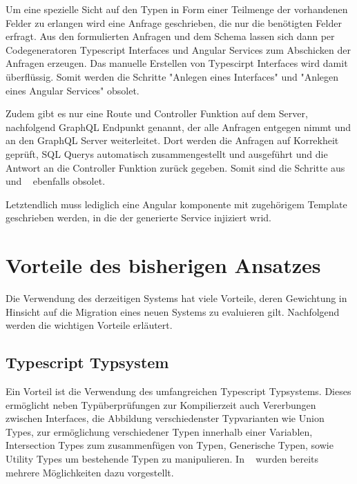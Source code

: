 Um eine spezielle Sicht auf den Typen in Form einer Teilmenge der vorhandenen Felder zu erlangen wird eine Anfrage geschrieben, die
nur die benötigten Felder erfragt. Aus den formulierten Anfragen und dem Schema lassen sich dann per Codegeneratoren Typescript Interfaces und
Angular Services zum Abschicken der Anfragen erzeugen. Das manuelle Erstellen von Typescirpt Interfaces wird damit überflüssig.
Somit werden die Schritte "Anlegen eines Interfaces" und "Anlegen eines Angular Services" obsolet.

Zudem gibt es nur eine Route und Controller Funktion auf dem Server, nachfolgend GraphQL Endpunkt genannt, der alle Anfragen entgegen nimmt
und an den GraphQL Server weiterleitet. Dort werden die Anfragen auf Korrekheit geprüft,
SQL Querys automatisch zusammengestellt und ausgeführt und die Antwort an die Controller Funktion zurück gegeben.
Somit sind die Schritte aus  und ~ ebenfalls obsolet.

Letztendlich muss lediglich eine Angular komponente mit zugehörigem Template geschrieben werden, in die der generierte Service injiziert wrid.

\section{Vorteile des bisherigen Ansatzes}
\label{sec:requirements:pros}
Die Verwendung des derzeitigen Systems hat viele Vorteile,
deren Gewichtung in Hinsicht auf die Migration eines neuen Systems zu evaluieren gilt.
Nachfolgend werden die wichtigen Vorteile erläutert.

\subsection{Typescript Typsystem}
\label{sec:requirements:pros:typescript}
Ein Vorteil ist die Verwendung des umfangreichen Typescript Typsystems.
Dieses ermöglicht neben Typüberprüfungen zur Kompilierzeit auch Vererbungen zwischen Interfaces, die Abbildung verschiedenster Typvarianten wie
Union Types, zur ermöglichung verschiedener Typen innerhalb einer Variablen, Intersection Types zum zusammenfügen von Typen,
Generische Typen, sowie Utility Types um bestehende Typen zu manipulieren.
In ~ wurden bereits mehrere Möglichkeiten dazu vorgestellt.

